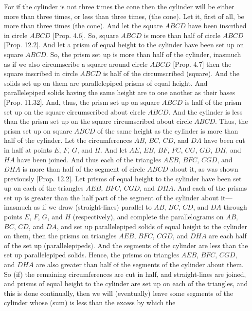 \begin{Parallel}{}{}
{For if the cylinder is not three times the cone then the cylinder will be either more than three times, or less than three times, (the cone). Let it, first
of all, be  more than three times (the cone). And  let the square $ABCD$ have been inscribed in circle $ABCD$ [Prop. 4.6].
So, square $ABCD$ is more than half of circle $ABCD$  [Prop. 12.2]. And let a prism
of equal height to the cylinder have been set up on square $ABCD$. So, the prism set up is more than half of the
cylinder, inasmuch as  if we also circumscribe a square around circle $ABCD$ [Prop. 4.7] then the square inscribed in circle $ABCD$ is half of the circumscribed (square). And the  solids  set up on them are parallelepiped
prisms  of equal height.  And parallelepiped solids having the same height are to one
another as their bases [Prop. 11.32]. And, thus, the prism set up on square $ABCD$ is half
of the prism set up on the square circumscribed about circle $ABCD$. And the cylinder is less than the prism
set up on the square circumscribed about circle $ABCD$. Thus, the prism set up on square $ABCD$ of the
same height as the cylinder is more than half of the cylinder. Let the circumferences $AB$, $BC$, $CD$, and $DA$
have been cut in half at points $E$, $F$, $G$, and $H$. And let $AE$, $EB$, $BF$, $FC$, $CG$, $GD$, $DH$,
and $HA$ have been joined. And thus each of the triangles $AEB$, $BFC$, $CGD$, and $DHA$ is more than
half of the segment of circle $ABCD$ about it, as was shown previously [Prop. 12.2].
Let prisms of equal height to the cylinder have been set up on each of the triangles $AEB$, $BFC$, $CGD$,
and $DHA$.  And each of the prisms set up is greater than the half part of the segment of the cylinder about it---inasmuch
as if we  draw (straight-lines) parallel to $AB$, $BC$, $CD$, and $DA$ through points $E$, $F$, $G$, and $H$
(respectively), and complete the parallelograms on $AB$, $BC$, $CD$, and $DA$, and set up parallelepiped solids
of equal height to the cylinder on them, then the prisms on triangles $AEB$, $BFC$, $CGD$, and $DHA$ are each half
of the set up (parallelepipeds). And the segments of the cylinder are less than the set up parallelepiped solids. 
Hence, the prisms on triangles $AEB$, $BFC$, $CGD$, and $DHA$ are also greater than half of the segments
of the cylinder about them. So (if) the remaining circumferences are cut in half, and straight-lines are joined,
and prisms of equal height to the cylinder are set up on each of the triangles, and this is done
continually,  then we will (eventually) leave some segments of the cylinder whose (sum) is less than the excess by which the
}
\end{Parallel}
